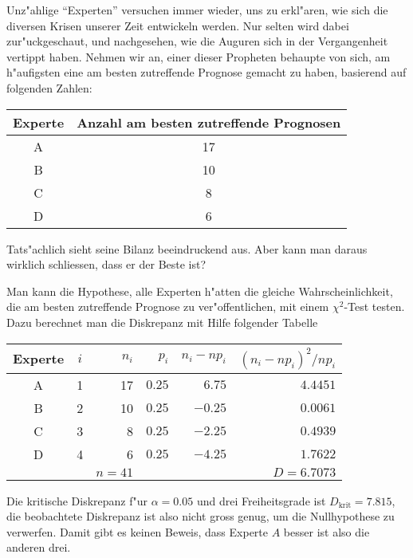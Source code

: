 Unz"ahlige ``Experten'' versuchen immer wieder, uns zu erkl"aren,
wie sich die diversen Krisen unserer Zeit entwickeln werden. Nur
selten wird dabei zur"uckgeschaut, und nachgesehen, wie die Auguren
sich in der Vergangenheit vertippt haben. Nehmen wir an, einer
dieser Propheten behaupte von sich, am h"aufigsten eine am besten
zutreffende
Prognose gemacht zu haben, basierend auf folgenden Zahlen:
\begin{center}
\begin{tabular}{cc}
\hline
Experte&Anzahl am besten zutreffende Prognosen\\
\hline
A&17\\
B&10\\
C&8\\
D&6\\
\hline
\end{tabular}
\end{center}
Tats"achlich sieht seine Bilanz beeindruckend aus. Aber
kann man daraus wirklich schliessen, dass er der Beste ist?

\begin{loesung}
Man kann die Hypothese, alle Experten h"atten die gleiche Wahrscheinlichkeit,
die am besten zutreffende Prognose zu ver"offentlichen, mit einem $\chi^2$-Test
testen. Dazu berechnet man die Diskrepanz mit Hilfe folgender Tabelle
\begin{center}
\begin{tabular}{|c|crrrr|}
\hline
Experte&
$i$& $n_i$& $p_i$&$n_i-np_i$&$(n_i-np_i)^2/np_i$\\
\hline
A&  1&    17&$0.25$&$6.75$ &$4.4451$\\
B&  2&    10&$0.25$&$-0.25$&$0.0061$\\
C&  3&     8&$0.25$&$-2.25$&$0.4939$\\
D&  4&     6&$0.25$&$-4.25$&$1.7622$\\
\hline
 &   &$n=41$&      &      &$D=6.7073$\\
\hline
\end{tabular}
\end{center}
Die kritische Diskrepanz f"ur $\alpha=0.05$ und drei Freiheitsgrade ist
$D_{\text{krit}}=7.815$, die beobachtete Diskrepanz ist also nicht
gross genug, um die Nullhypothese zu verwerfen. Damit gibt es keinen
Beweis, dass Experte $A$ besser ist also die anderen drei.
\end{loesung}

